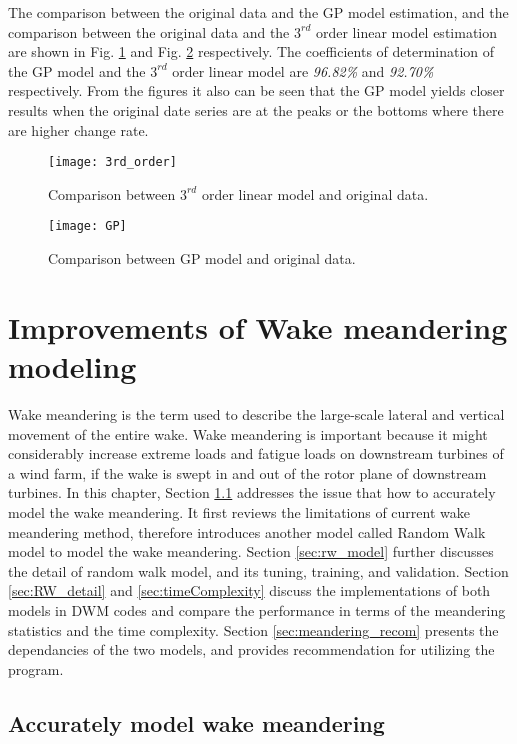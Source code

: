 \documentclass{umthesis}
\begin{document}
The comparison between the original data and the GP model estimation, and the comparison between the original data and the $3^{rd}$ order linear model estimation are shown in Fig. \ref{fig:3rd_order} and Fig. \ref{fig:GP} respectively. The coefficients of determination of the GP model and the $3^{rd}$ order linear model are \emph{96.82\%} and \emph{92.70\%} respectively. From the figures it also can be seen that the GP model yields closer results when the original date series are at the peaks or the bottoms where there are higher change rate.

\begin{figure}
  \centering
  \texttt{[image: 3rd\_order]}
  \caption{Comparison between $3^{rd}$ order linear model and original data.}\label{fig:3rd_order}
\end{figure}

\begin{figure}
  \centering
  \texttt{[image: GP]}
  \caption{Comparison between GP model and original data.}\label{fig:GP}
\end{figure}


\chapter{Improvements of Wake meandering modeling}
Wake meandering is the term used to describe the large-scale lateral and vertical movement of the entire wake. Wake meandering is important because it might considerably increase extreme loads and fatigue loads on downstream turbines of a wind farm, if the wake is swept in and out of the rotor plane of downstream turbines. In this chapter, Section \ref{sec:general_meandering_model} addresses the issue that how to accurately model the wake meandering. It first reviews the limitations of current wake meandering method, therefore introduces another model called Random Walk model to model the wake meandering.  Section \ref{sec:rw_model}   further discusses the detail of random walk model, and its tuning, training, and validation. Section \ref{sec:RW_detail} and \ref{sec:timeComplexity} discuss the implementations of both models in DWM codes and compare the performance in terms of the meandering statistics and the time complexity. Section \ref{sec:meandering_recom} presents the dependancies of the two models, and provides recommendation for utilizing the program.

\section{Accurately model wake meandering}\label{sec:general_meandering_model}
\end{document}
